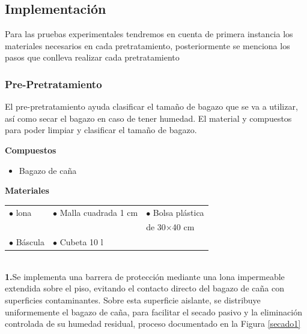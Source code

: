 \documentclass[12pt]{article}
\begin{document}
	
	\newpage
			
			
	
			\subsection{Implementación}

			Para las pruebas experimentales tendremos en cuenta de primera instancia los materiales necesarios en cada pretratamiento, posteriormente se menciona los pasos que conlleva realizar cada pretratamiento
			

			\subsubsection{Pre-Pretratamiento}

			
			El pre-pretratamiento ayuda clasificar el tamaño de bagazo que se va a utilizar, así como secar el bagazo en caso de tener humedad. El material y compuestos para poder limpiar y clasificar el tamaño de bagazo.
			
			\textbf{Compuestos} 
			
			\begin{itemize}[label=\textcolor{blue}{$\bullet$}]
			 \item	 Bagazo de caña 
			\end{itemize}
			
			
			\textbf{Materiales} 
			
			
			\begin{tabular}{p{0.3\textwidth}p{}p{}}
				$\bullet$ lona & $\bullet$  Malla cuadrada 1 cm & $\bullet$ Bolsa plástica  \\
				&&de 30×40 cm \\
				$\bullet$ Báscula & $\bullet$ Cubeta 10 l & 
			\end{tabular}
			\\
			
			
			\textbf{1.}Se implementa una barrera de protección mediante una lona impermeable extendida sobre el piso, evitando el contacto directo del bagazo de caña con superficies contaminantes. Sobre esta superficie aislante, se distribuye uniformemente el bagazo de caña, para facilitar el secado pasivo y la eliminación controlada de su humedad residual, proceso documentado en la Figura \ref{secado1}
\end{document}

